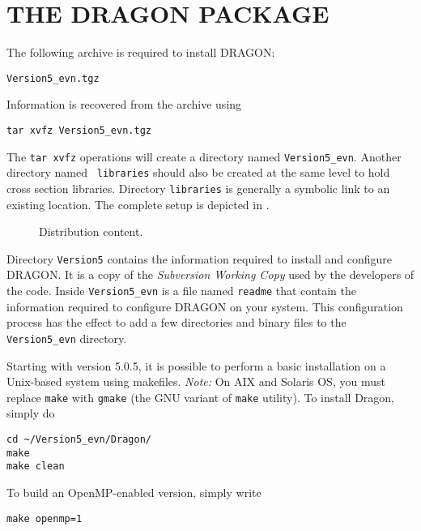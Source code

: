 \section{THE DRAGON PACKAGE}\label{sect:DragonExportPackage}

The following archive is required to install DRAGON:

\begin{verbatim}
Version5_evn.tgz
\end{verbatim}

\vskip 0.08cm

Information is recovered from the archive using
\begin{verbatim}
tar xvfz Version5_evn.tgz
\end{verbatim}

\noindent The {\tt tar xvfz} operations will create a directory named {\tt Version5\_evn}. Another directory named {\tt
libraries} should also be created at the same level to hold cross section libraries. Directory {\tt libraries} is
generally a symbolic link to an existing location. The complete setup is depicted in .

\begin{figure}[h!]  
\begin{center} 
\epsfxsize=10cm \centerline{ }
\parbox{16cm}{\caption{Distribution content.}\label{fig:tree2}}    
\end{center}  
\end{figure}

Directory {\tt Version5} contains the information required to install and configure
DRAGON. It is a copy of the {\sl Subversion Working Copy} used by the developers of the
code. Inside {\tt Version5\_evn} is a file named {\tt readme} that contain the
information required to configure DRAGON on your system. This configuration
process has the effect to add a few directories and binary files to the
{\tt Version5\_evn} directory.

\vskip 0.08cm

Starting with version 5.0.5, it is possible to perform a basic installation on a Unix-based system
using makefiles. {\sl Note:} On AIX and Solaris OS, you must replace {\tt make} with {\tt gmake} (the
GNU variant of {\tt make} utility). To install Dragon, simply do
\begin{verbatim}
cd ~/Version5_evn/Dragon/
make
make clean
\end{verbatim}

\noindent To build an OpenMP-enabled version, simply write
\begin{verbatim}
make openmp=1
\end{verbatim}

